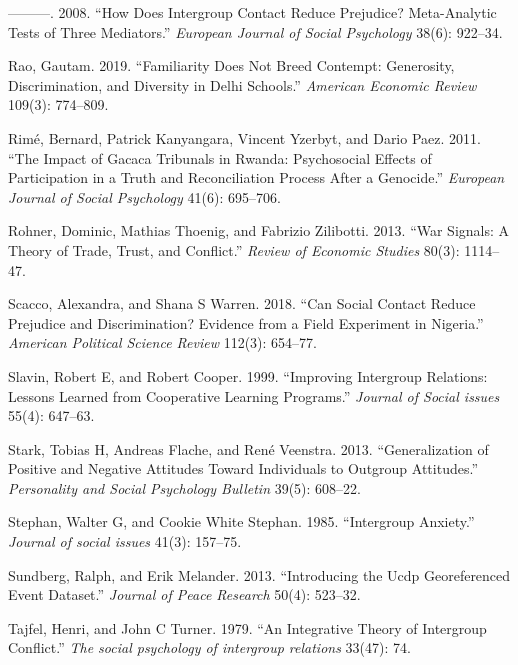 \documentclass[11pt]{article}
\begin{document}
\leavevmode\hypertarget{ref-pettigrew2008does}{}%
---------. 2008. ``How Does Intergroup Contact Reduce Prejudice?
Meta-Analytic Tests of Three Mediators.'' \emph{European Journal of
Social Psychology} 38(6): 922--34.

\leavevmode\hypertarget{ref-rao2019familiarity}{}%
Rao, Gautam. 2019. ``Familiarity Does Not Breed Contempt: Generosity,
Discrimination, and Diversity in Delhi Schools.'' \emph{American
Economic Review} 109(3): 774--809.

\leavevmode\hypertarget{ref-rime2011impact}{}%
Rimé, Bernard, Patrick Kanyangara, Vincent Yzerbyt, and Dario Paez.
2011. ``The Impact of Gacaca Tribunals in Rwanda: Psychosocial Effects
of Participation in a Truth and Reconciliation Process After a
Genocide.'' \emph{European Journal of Social Psychology} 41(6):
695--706.

\leavevmode\hypertarget{ref-rohner2013war}{}%
Rohner, Dominic, Mathias Thoenig, and Fabrizio Zilibotti. 2013. ``War
Signals: A Theory of Trade, Trust, and Conflict.'' \emph{Review of
Economic Studies} 80(3): 1114--47.

\leavevmode\hypertarget{ref-scacco2018nigeria}{}%
Scacco, Alexandra, and Shana S Warren. 2018. ``Can Social Contact Reduce
Prejudice and Discrimination? Evidence from a Field Experiment in
Nigeria.'' \emph{American Political Science Review} 112(3): 654--77.

\leavevmode\hypertarget{ref-slavin1999improving}{}%
Slavin, Robert E, and Robert Cooper. 1999. ``Improving Intergroup
Relations: Lessons Learned from Cooperative Learning Programs.''
\emph{Journal of Social issues} 55(4): 647--63.

\leavevmode\hypertarget{ref-stark2013generalization}{}%
Stark, Tobias H, Andreas Flache, and René Veenstra. 2013.
``Generalization of Positive and Negative Attitudes Toward Individuals
to Outgroup Attitudes.'' \emph{Personality and Social Psychology
Bulletin} 39(5): 608--22.

\leavevmode\hypertarget{ref-stephan1985intergroup}{}%
Stephan, Walter G, and Cookie White Stephan. 1985. ``Intergroup
Anxiety.'' \emph{Journal of social issues} 41(3): 157--75.

\leavevmode\hypertarget{ref-ucdp}{}%
Sundberg, Ralph, and Erik Melander. 2013. ``Introducing the Ucdp
Georeferenced Event Dataset.'' \emph{Journal of Peace Research} 50(4):
523--32.

\leavevmode\hypertarget{ref-tajfel1979integrative}{}%
Tajfel, Henri, and John C Turner. 1979. ``An Integrative Theory of
Intergroup Conflict.'' \emph{The social psychology of intergroup
relations} 33(47): 74.
\end{document}
